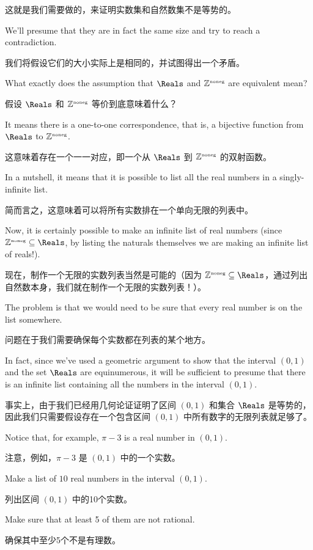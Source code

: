 这就是我们需要做的，来证明实数集和自然数集不是等势的。

We'll presume that they are in fact the same size and try to reach a
contradiction.

我们将假设它们的大小实际上是相同的，并试图得出一个矛盾。

What exactly does the assumption that $\Reals$ and ${\mathbb Z}^{\mbox{\tiny noneg}}$ are
equivalent mean?

假设 $\Reals$ 和 ${\mathbb Z}^{\mbox{\tiny noneg}}$ 等价到底意味着什么？

It means there is a one-to-one correspondence, that is, a bijective function
from $\Reals$ to ${\mathbb Z}^{\mbox{\tiny noneg}}$.

这意味着存在一个一一对应，即一个从 $\Reals$ 到 ${\mathbb Z}^{\mbox{\tiny noneg}}$ 的双射函数。

In a nutshell, it means that it is
possible to list all the real
numbers in a singly-infinite list.

简而言之，这意味着可以将所有实数排在一个单向无限的列表中。

Now, it is certainly possible to make an
infinite list of real numbers (since $\Naturals \subseteq \Reals$,
by listing the naturals themselves
we are making an infinite list of reals!).

现在，制作一个无限的实数列表当然是可能的（因为 $\Naturals \subseteq \Reals$，通过列出自然数本身，我们就在制作一个无限的实数列表！）。

The problem is that we would need
to be sure that every real number is on the list somewhere.

问题在于我们需要确保每个实数都在列表的某个地方。

In fact, since
we've used a geometric argument to show that the interval $(0, 1)$ and the
set $\Reals$ are equinumerous, it will be sufficient to presume that there
is an infinite list containing all the numbers in the interval $(0, 1)$.

事实上，由于我们已经用几何论证证明了区间 $(0, 1)$ 和集合 $\Reals$ 是等势的，因此我们只需要假设存在一个包含区间 $(0, 1)$ 中所有数字的无限列表就足够了。

\begin{exer}  Notice that, for example,  $\pi-3$ is a real number in
$(0, 1)$.

注意，例如，$\pi-3$ 是 $(0, 1)$ 中的一个实数。

    Make
    a list of $10$ real numbers in the interval $(0, 1)$.

    列出区间 $(0, 1)$ 中的10个实数。

    Make sure that
    at least 5 of them are not rational.

    确保其中至少5个不是有理数。

\end{exer}

